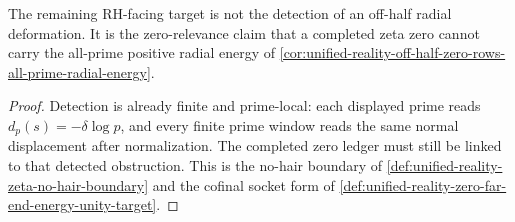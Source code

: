\begin{corollary}
\label{cor:unified-reality-no-hair-target-zero-relevance-radial-energy}
The remaining RH-facing target is not the detection of an off-half
radial deformation.  It is the zero-relevance claim that a completed
zeta zero cannot carry the all-prime positive radial energy of
\autoref{cor:unified-reality-off-half-zero-rows-all-prime-radial-energy}.
\end{corollary}

\begin{proof}
Detection is already finite and prime-local: each displayed prime reads
$d_p(s)=-\delta\log p$, and every finite prime window reads the same
normal displacement after normalization.  The completed zero ledger must
still be linked to that detected obstruction.  This is the no-hair
boundary of
\autoref{def:unified-reality-zeta-no-hair-boundary} and the cofinal
socket form of
\autoref{def:unified-reality-zero-far-end-energy-unity-target}.
\end{proof}
